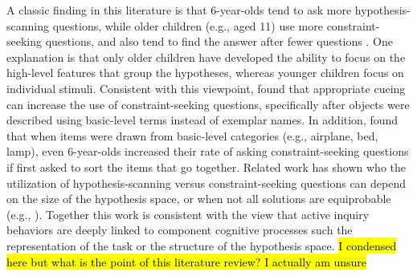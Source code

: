 \documentclass[10pt,letterpaper]{article}
\begin{document}
A classic finding
in this literature is that 6-year-olds tend to ask more hypothesis-scanning questions, 
while older children (e.g., aged 11) use more constraint-seeking  questions, and also 
tend to find the answer after fewer questions \cite{Mosher:1966}. 
One explanation is that only older children have developed the ability to focus on the 
high-level features that group the hypotheses, whereas younger children focus on 
individual stimuli.
Consistent with this viewpoint,
 found that appropriate cueing can increase the use of 
constraint-seeking questions, specifically after objects were described 
using basic-level terms instead of exemplar names.
In addition,  
found that when items were drawn from basic-level categories (e.g., airplane, 
bed, lamp), even 6-year-olds increased their rate of asking constraint-seeking 
questions if first asked to sort the items that go together.   
Related work has shown who the utilization of hypothesis-scanning versus
constraint-seeking questions can depend on the size of the hypothesis space,
or when not all solutions are equiprobable (e.g.,  ).
Together this work is consistent with the view that active inquiry behaviors are deeply linked
to component cognitive processes such the representation of the task or
the structure of the hypothesis space. \hl{I condensed here but what is the point of this literature
review?  I actually am unsure}
%






%
% 
%
\end{document}
